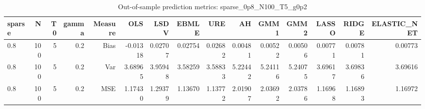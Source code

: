\begin{table}[!htbp]\centering
\caption{Out-of-sample prediction metrics: sparse_0p8_N100_T5_g0p2}
\label{tab:table3_sparse_0p8_N100_T5_g0p2}
\begin{tabular}{lrrrrrrrrrrrrrr}
\hline
sparse & N & T0 & gamma & Measure & OLS & LSDV & EBMLE & URE & AH & GMM1 & GMM2 & LASSO & RIDGE & ELASTIC_NET \\
\hline
0.8 & 100 & 5 & 0.2 & Bias & -0.01318 & 0.02707 & 0.02754 & 0.02682 & 0.00481 & 0.00522 & 0.00506 & 0.00771 & 0.00781 & 0.00773 \\
0.8 & 100 & 5 & 0.2 & Var & 3.68965 & 3.95948 & 3.58259 & 3.58833 & 5.22442 & 5.24116 & 5.24075 & 3.69617 & 3.69836 & 3.69616 \\
0.8 & 100 & 5 & 0.2 & MSE & 1.17430 & 1.29379 & 1.13670 & 1.13772 & 2.01907 & 2.03692 & 2.03786 & 1.16968 & 1.16893 & 1.16972 \\
\hline
\end{tabular}
\end{table}


